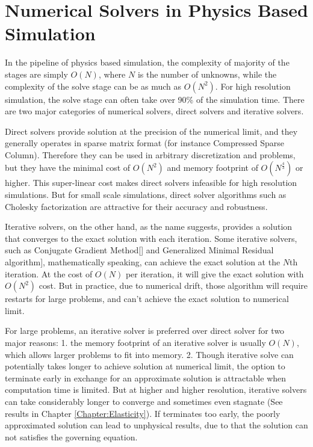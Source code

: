\chapter{Numerical Solvers in Physics Based Simulation} \label{Chapter:Solver}
In the pipeline of physics based simulation, the complexity of majority of the stages are simply $O(N)$, where $N$ is the number of unknowns, while the complexity of the solve stage can be as much as $O(N^2)$. For high resolution simulation, the solve stage can often take over 90\% of the simulation time. There are two major categories of numerical solvers, direct solvers and iterative solvers. 

Direct solvers provide solution at the precision of the numerical limit, and they generally operates in sparse matrix format (for instance Compressed Sparse Column). Therefore they can be used in arbitrary discretization and problems, but they have the minimal cost of $O(N^2)$ and memory footprint of $O(N^{\frac{4}{3}})$ or higher. This super-linear cost makes direct solvers infeasible for high resolution simulations. But for small scale simulations, direct solver algorithms such as Cholesky factorization are attractive for their accuracy and robustness. 

Iterative solvers, on the other hand, as the name suggests, provides a solution that converges to the exact solution with each iteration. Some iterative solvers, such as Conjugate Gradient Method[\cite{nocedal2006conjugate}] and Generalized Minimal Residual algorithm\cite{saad1986gmres}], mathematically speaking, can achieve the exact solution at the $N$th iteration. At the cost of $O(N)$ per iteration, it will give the exact solution with $O(N^2)$ cost. But in practice, due to numerical drift, those algorithm will require restarts for large problems, and can't achieve the exact solution to numerical limit. 

For large problems, an iterative solver is preferred over direct solver for two major reasons: 1. the memory footprint of an iterative solver is usually $O(N)$, which allows larger problems to fit into memory. 2. Though iterative solve can potentially takes longer to achieve solution at numerical limit, the option to terminate early in exchange for an approximate solution is attractable when computation time is limited. But at higher and higher resolution, iterative solvers can take considerably longer to converge and sometimes even stagnate (See results in Chapter \ref{Chapter:Elasticity}). If terminates too early, the poorly approximated solution can lead to unphysical results, due to that the solution can not satisfies the governing equation.

